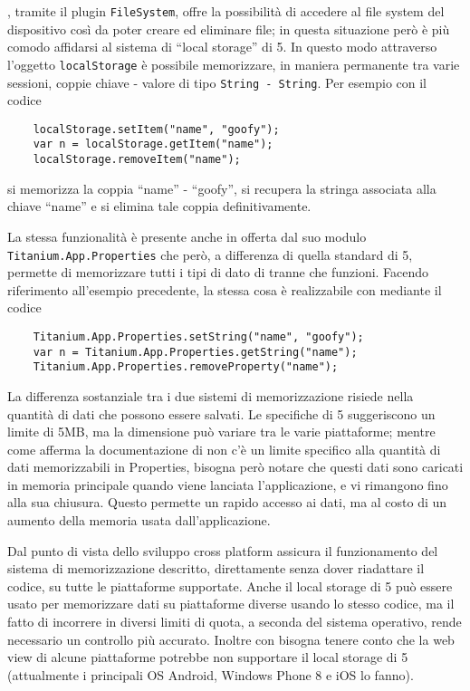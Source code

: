 			\pg{}, tramite il plugin
			\texttt{FileSystem}, offre la possibilità di accedere al file system
			del dispositivo così da poter creare ed	eliminare file; in questa
			situazione però è più comodo affidarsi al sistema di ``lo\-cal stor\-age''
			di \html{}5. In questo modo attraverso l'oggetto \js{} \texttt{localStorage}
			è possibile memorizzare, in maniera permanente tra varie sessioni, coppie
			chiave - valore di tipo \texttt{String - String}. Per esempio con il
			codice
			\begin{lstlisting}
	localStorage.setItem("name", "goofy");
	var n = localStorage.getItem("name");
	localStorage.removeItem("name");
			\end{lstlisting}
			si memorizza la coppia ``name'' - ``goofy'', si recupera la stringa associata
			alla chiave ``name'' e si elimina tale coppia definitivamente.
			
			La stessa funzionalità è presente anche in \tisdk{} offerta dal suo
			modulo \texttt{Titanium.App.Properties} che però, a differenza di
			quella standard di \html{}5, permette di memorizzare tutti i tipi di
			dato di \js{} tranne che funzioni. Facendo riferimento all'esempio 
			precedente, la stessa cosa è realizzabile con \tisdk mediante il
			codice
			\begin{lstlisting}
	Titanium.App.Properties.setString("name", "goofy");
	var n = Titanium.App.Properties.getString("name");
	Titanium.App.Properties.removeProperty("name");
			\end{lstlisting}

			La differenza sostanziale tra i due sistemi di memorizzazione risiede 
			nella quantità di dati che possono essere salvati. 
			Le specifiche di \html{}5 suggeriscono un limite di 5MB, ma la dimensione 
			può variare tra le varie piattaforme; mentre come afferma la documentazione 
			di \tisdk{} non c'è un limite specifico alla quantità di dati memorizzabili
			in Properties, bisogna però notare che questi dati sono caricati in 
			memoria principale quando 
			viene lanciata l'applicazione, e vi rimangono fino alla sua chiusura.
			Questo permette un rapido accesso ai dati, ma al costo di un aumento 
			della memoria usata dall'applicazione. 
			
			Dal punto di vista dello sviluppo cross platform \tisdk{} assicura il funzionamento 
			del sistema di memorizzazione descritto, direttamente senza dover riadattare il codice,
			su tutte le piattaforme supportate. Anche il local storage 
			di \html{}5 può essere usato per memorizzare dati su piattaforme diverse 
			usando lo stesso codice, ma il fatto di incorrere in diversi limiti di quota, 
			a seconda del sistema operativo, rende necessario un controllo più 
			accurato. Inoltre con \pg{} bisogna tenere conto che la web view di 
			alcune piattaforme potrebbe non supportare il local storage di \html{}5 
			(attualmente i principali OS Android, Windows Phone 8 e iOS lo fanno).
			

